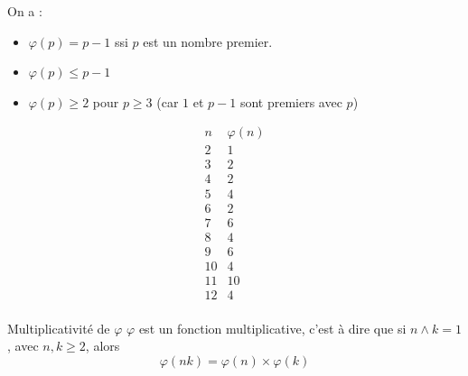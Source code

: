 \begin{remarque}
    On a : 
    \begin{itemize}
        \item $\varphi(p) = p - 1$ ssi $p$ est un nombre premier.
        \item $\varphi(p) \leqslant p - 1$
        \item $\varphi(p) \geqslant 2$ pour $p \geqslant 3$ (car $1$ et $p - 1$ sont premiers avec $p$)
    \end{itemize}
\end{remarque}

\[
    \begin{array}{c|c}
        n & \varphi(n) \\
        \hline
        2 & 1 \\
        3 & 2 \\
        4 & 2 \\
        5 & 4 \\
        6 & 2 \\
        7 & 6 \\
        8 & 4 \\
        9 & 6 \\
        10 & 4 \\
        11 & 10 \\
        12 & 4 \\
    \end{array}
\]

\begin{theoreme}{Multiplicativité de $\varphi$}{}
    $\varphi$ est un fonction multiplicative, c'est à dire que 
    si $n \wedge k = 1$, avec $n, k \geqslant 2$, alors
    $$\varphi(nk) = \varphi(n) \times \varphi(k)$$
\end{theoreme}

